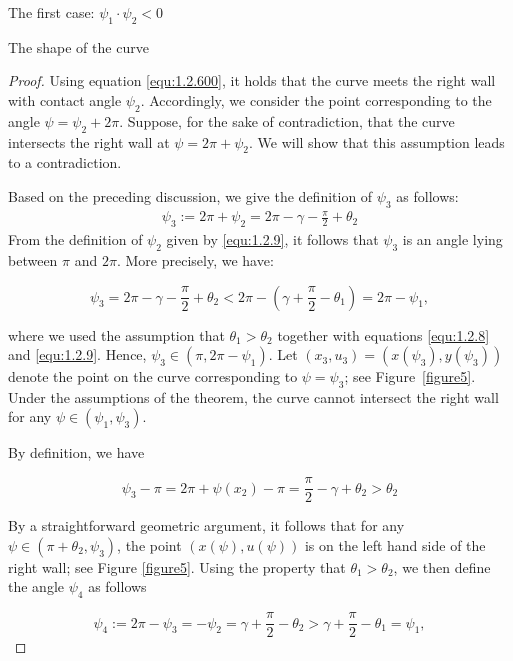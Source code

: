 \documentclass[letterpaper,reqno,10pt,twoside]{amsart}
\theoremstyle{definition}
\theoremstyle{remark}
\begin{document}
\begin{section}{The first case: $\psi_1\cdot \psi_2<0$ }
\begin{subsection}{The shape of the curve}
\begin{proof}
         Using equation \eqref{equ:1.2.600}, it holds that the curve meets the right wall with contact angle $\psi_2$. Accordingly, we consider the point corresponding to the angle $\psi=\psi_2+2\pi$. Suppose, for the sake of contradiction, that the curve intersects the right wall at $\psi=2\pi+\psi_2$. We will show that this assumption leads to a contradiction.
         
         Based on the preceding discussion, we give the definition of $\psi_{3}$ as follows:
         \begin{align}
             \psi_3:=2\pi+\psi_{2}=2\pi-\gamma-\frac{\pi}{2}+\theta_{2}
         \end{align}
         From the definition of $\psi_{2}$ given by \eqref{equ:1.2.9}, it follows that $\psi_{3}$ is an angle lying between $\pi$ and $2\pi$. More precisely, we have:

          \begin{equation*}
              \psi_3=2\pi-\gamma-\frac{\pi}{2}+\theta_{2}<2\pi-(\gamma+\frac{\pi}{2}-\theta_1)=2\pi-\psi_1,
          \end{equation*}

          \noindent where we used the assumption that $\theta_1>\theta_2$ together with equations \eqref{equ:1.2.8} and \eqref{equ:1.2.9}. Hence, $\psi_3\in (\pi,2\pi-\psi_1)$.
        Let $(x_{3},u_{3})=(x(\psi_{3}),y(\psi_{3}))$ denote the point on the curve corresponding to $\psi=\psi_{3}$; see Figure~\ref{figure5}. Under the assumptions of the theorem, the curve cannot intersect the right wall for any $\psi\in(\psi_{1},\psi_{3})$.

          By definition, we have

          \begin{equation*}
          \psi_{3}-\pi=2\pi+\psi(x_2)-\pi=\frac{\pi}{2}-\gamma+\theta_{2}>\theta_2
          \end{equation*}
          
          \noindent By a straightforward geometric argument, it follows that for any $\psi\in (\pi+\theta_2,\psi_3)$, the point $(x(\psi),u(\psi))$ is on the left hand side of the right wall; see Figure \ref{figure5}. 
           Using the property that $\theta_1>\theta_2$, we then define the angle $\psi_{4}$ as follows

          \begin{equation*}
          \psi_{4}:=2\pi-\psi_3=-\psi_{2}=\gamma+\frac{\pi}{2}-\theta_2>\gamma+\frac{\pi}{2}-\theta_1=\psi_1, 
          \end{equation*}
          

\end{proof}
\end{subsection}
\end{section}
\end{document}
